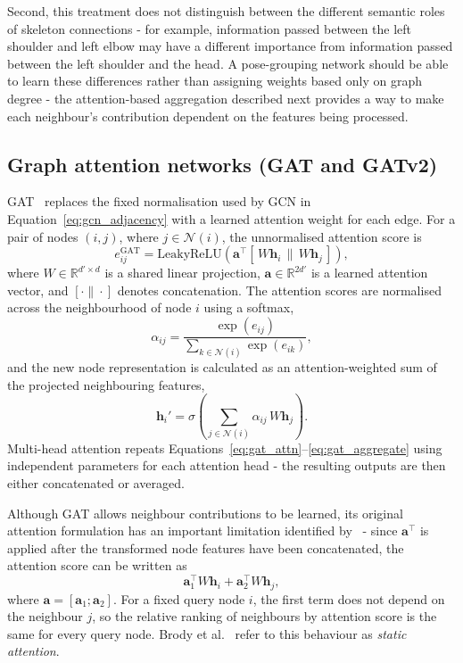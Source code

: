 Second, this treatment does not distinguish between the different semantic roles of skeleton connections -
for example,
information passed between the left shoulder and left elbow
may have a different importance from information passed between the left shoulder and the head.
A pose-grouping network should be able to learn these differences
rather than assigning weights based only on graph degree -
the attention-based aggregation described next
provides a way to make each neighbour's contribution dependent on the features being processed.

\subsection{Graph attention networks (GAT and GATv2)}
\label{sec_meth_gat}

GAT~\cite{velickovic2018gat} replaces the fixed normalisation used by GCN in Equation~\eqref{eq:gcn_adjacency}
with a learned attention weight for each edge.
For a pair of nodes $(i,j)$, where $j \in \mathcal{N}(i)$, the unnormalised attention score is
\begin{equation}
    e_{ij}^{\mathrm{GAT}} =
    \mathrm{LeakyReLU}\!\left(
        \mathbf{a}^{\top}
        \left[\,W\mathbf{h}_i \,\|\, W\mathbf{h}_j\,\right]
    \right),
    \label{eq:gat_attn}
\end{equation}
where $W \in \mathbb{R}^{d' \times d}$ is a shared linear projection,
$\mathbf{a} \in \mathbb{R}^{2d'}$ is a learned attention vector,
and $[\cdot \| \cdot]$ denotes concatenation.
The attention scores are normalised across the neighbourhood of node $i$ using a softmax,
\begin{equation}
    \alpha_{ij} =
    \frac{\exp(e_{ij})}
    {\sum_{k \in \mathcal{N}(i)} \exp(e_{ik})},
    \label{eq:gat_softmax}
\end{equation}
and the new node representation is calculated
as an attention-weighted sum of the projected neighbouring features,
\begin{equation}
    \mathbf{h}_i' =
    \sigma\!\left(
        \sum_{j \in \mathcal{N}(i)}
        \alpha_{ij}\,W\mathbf{h}_j
    \right).
    \label{eq:gat_aggregate}
\end{equation}
Multi-head attention repeats Equations~\eqref{eq:gat_attn}--\eqref{eq:gat_aggregate}
using independent parameters for each attention head -
the resulting outputs are then either concatenated or averaged.

Although GAT allows neighbour contributions to be learned,
its original attention formulation has an important limitation identified by~\cite{brody2022gatv2} -
since $\mathbf{a}^{\top}$ is applied after the transformed node features have been concatenated,
the attention score can be written as
\begin{equation}
    \mathbf{a}_1^{\top}W\mathbf{h}_i +
    \mathbf{a}_2^{\top}W\mathbf{h}_j,
\end{equation}
where $\mathbf{a} = [\mathbf{a}_1;\mathbf{a}_2]$.
For a fixed query node $i$, the first term does not depend on the neighbour $j$,
so the relative ranking of neighbours by attention score is the same for every query node.
Brody et al.~\cite{brody2022gatv2} refer to this behaviour as \emph{static attention}.

